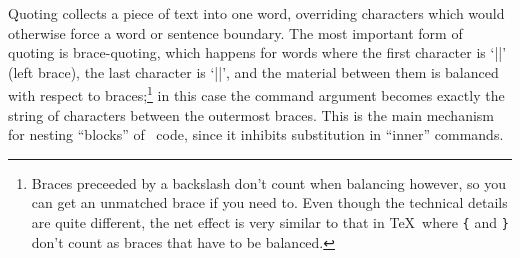 \documentclass{mtmtcl}
\newcommand{\cs}[1]{\texttt{\PrintChar{92}#1}}
\theoremstyle{plain}
\theoremstyle{remark}
\begin{document}
Quoting collects a piece of text into one word, overriding characters 
which would otherwise force a word or sentence boundary. The most 
important form of quoting is brace-quoting, which happens for words 
where the first character is `|{|' (left brace), the last character 
is `|}|', and the material between them is balanced with respect to 
braces;\footnote{
  Braces preceeded by a backslash don't count when balancing however, 
  so you can get an unmatched brace if you need to. Even though the 
  technical details are quite different, the net effect is 
  very similar to that in \TeX\ where \cs{\{} and \cs{\}} don't 
  count as braces that have to be balanced.
} in this case the command argument becomes exactly the string 
of characters between the outermost braces. This is the main 
mechanism for nesting ``blocks'' of \Tcl\ code, since it inhibits 
substitution in ``inner'' commands.
\end{document}
